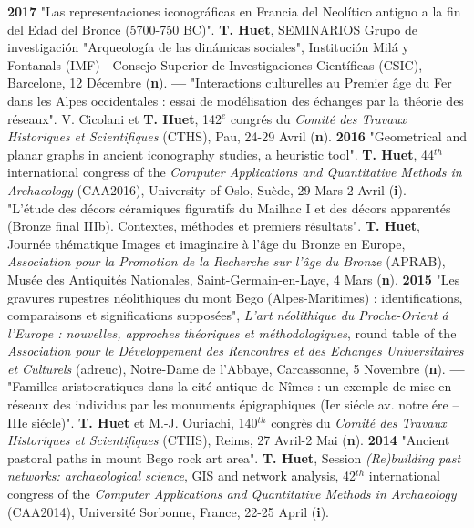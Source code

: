 \documentclass{article}
\begin{document}
{\smallbreak
\textbf{2017 }"Las representaciones iconogr\'{a}ficas en Francia del Neol\'{i}tico antiguo a la fin del Edad del Bronce (5700-750 BC)". \textbf{T. Huet}, SEMINARIOS Grupo de investigaci\'{o}n "Arqueolog\'{i}a de las din\'{a}micas sociales", Instituci\'{o}n Mil\'{a} y Fontanals (IMF) - Consejo Superior de Investigaciones Cient\'{i}ficas (CSIC), Barcelone, 12 D\'{e}cembre (\textbf{n}).
\smallbreak
\textbf{--- } "Interactions culturelles au Premier \^{a}ge du Fer dans les Alpes occidentales : essai de mod\'{e}lisation des \'{e}changes par la th\'{e}orie des r\'{e}seaux". V. Cicolani et \textbf{T. Huet}, 142${}^{e}$ congr\'{e}s du \textit{Comit\'{e} des Travaux Historiques et Scientifiques} (CTHS), Pau, 24-29 Avril (\textbf{n}).
\smallbreak
\textbf{2016 }"Geometrical and planar graphs in ancient iconography studies, a heuristic tool". \textbf{T. Huet}, 44${}^{th}$ international congress of the \textit{Computer Applications and Quantitative Methods in Archaeology} (CAA2016), University of Oslo, Suède, 29 Mars-2 Avril (\textbf{i}).
\smallbreak
\textbf{--- }"L'\'{e}tude des d\'{e}cors c\'{e}ramiques figuratifs du Mailhac I et des d\'{e}cors apparent\'{e}s (Bronze final IIIb). Contextes, m\'{e}thodes et premiers r\'{e}sultats". \textbf{T. Huet}, Journ\'{e}e th\'{e}matique Images et imaginaire \`{a} l'\^{a}ge du Bronze en Europe, \textit{Association pour la Promotion de la Recherche sur l'\^{a}ge du Bronze} (APRAB), Mus\'{e}e des Antiquit\'{e}s Nationales, Saint-Germain-en-Laye, 4 Mars (\textbf{n}).
\smallbreak
\textbf{2015 }"Les gravures rupestres n\'{e}olithiques du mont Bego (Alpes-Maritimes) : identifications, comparaisons et significations suppos\'{e}es", \textit{L'art n\'{e}olithique du Proche-Orient \'{a} l'Europe : nouvelles, approches th\'{e}oriques et m\'{e}thodologiques}, round table of the \textit{Association pour le D\'{e}veloppement des Rencontres et des Echanges Universitaires et Culturels} (adreuc), Notre-Dame de l'Abbaye, Carcassonne, 5 Novembre (\textbf{n}).
\smallbreak
\textbf{--- }"Familles aristocratiques dans la cit\'{e} antique de N\^{i}mes : un exemple de mise en r\'{e}seaux des individus par les monuments \'{e}pigraphiques (Ier si\'{e}cle av. notre \'{e}re -- IIIe si\'{e}cle)". \textbf{T. Huet} et M.-J. Ouriachi, 140${}^{th}$ congrès du \textit{Comit\'{e} des Travaux Historiques et Scientifiques} (CTHS), Reims, 27 Avril-2 Mai (\textbf{n}).
\smallbreak
\textbf{2014 }"Ancient pastoral paths in mount Bego rock art area". \textbf{T. Huet}, Session \textit{(Re)building past networks: archaeological science}, GIS and network analysis, 42${}^{th}$ international congress of the \textit{Computer Applications and Quantitative Methods in Archaeology} (CAA2014), Universit\'{e} Sorbonne, France, 22-25 April (\textbf{i}).
}
\end{document}
